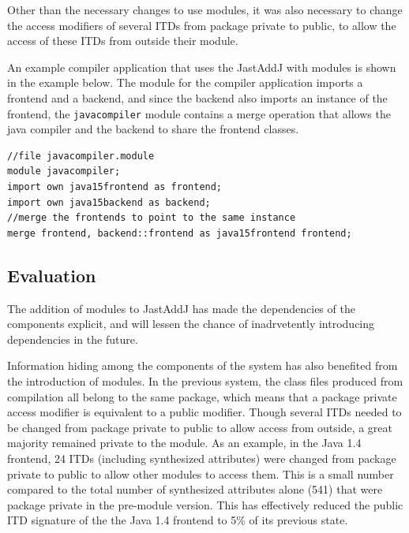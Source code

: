 Other than the necessary changes to use modules, it was also necessary to change the 
access modifiers of several ITDs from package private to public, to allow the 
access of these ITDs from outside their module. 

An example compiler application that uses the JastAddJ with modules is shown in the example below.
The module for the compiler application imports a frontend and a backend, and since the backend 
also imports an instance of the frontend, the \texttt{javacompiler} module contains a merge
operation that allows the java compiler and the backend to share the frontend classes.

\begin{lstlisting}[caption={JastAddJ Compiler Application}]
//file javacompiler.module
module javacompiler;
import own java15frontend as frontend;
import own java15backend as backend;
//merge the frontends to point to the same instance
merge frontend, backend::frontend as java15frontend frontend;
\end{lstlisting}

\subsection{Evaluation}

The addition of modules to JastAddJ has made the dependencies of the components
explicit, and will lessen the chance of inadrvetently introducing dependencies 
in the future. 

Information hiding among the components of the system has also benefited from
the introduction of modules. In the previous system, the class files produced from
compilation all belong to the same package, which means that a package private access modifier
is equivalent to a public modifier. Though several ITDs needed to be changed from 
package private to public to allow access from outside, a great majority remained private to
the module. As an example, in the Java 1.4 frontend, 24 ITDs (including synthesized attributes)
were changed from package private to public to allow other modules to access them. This is a small number 
compared to the total number of synthesized attributes alone (541) that were package private in the pre-module version.
This has effectively reduced the public ITD signature of the the Java 1.4 frontend to 5\% of its previous state.

